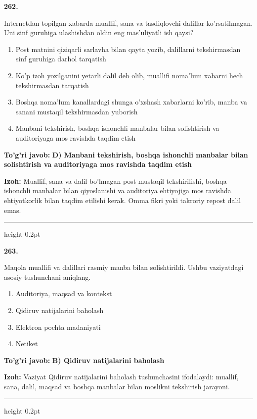 \documentclass[10pt,a4paper,oneside]{article}
\begin{document}
\noindent\textbf{\color{ink}262.}
\par
Internetdan topilgan xabarda muallif, sana va tasdiqlovchi dalillar ko'rsatilmagan. Uni sinf guruhiga ulashishdan oldin eng mas'uliyatli ish qaysi?
\begin{enumerate}[label=\Alph*),leftmargin=9mm]
\item Post matnini qiziqarli sarlavha bilan qayta yozib, dalillarni tekshirmasdan sinf guruhiga darhol tarqatish
\item Ko'p izoh yozilganini yetarli dalil deb olib, muallifi noma'lum xabarni hech tekshirmasdan tarqatish
\item Boshqa noma'lum kanallardagi shunga o'xshash xabarlarni ko'rib, manba va sanani mustaqil tekshirmasdan yuborish
\item Manbani tekshirish, boshqa ishonchli manbalar bilan solishtirish va auditoriyaga mos ravishda taqdim etish
\end{enumerate}
\begin{tcolorbox}[enhanced,breakable,colback=teal!4,colframe=teal!50!black,boxrule=0.5pt,arc=1.1mm,left=3mm,right=3mm,top=1.7mm,bottom=1.7mm,before skip=2mm,after skip=2mm]
\textbf{\color{teal}To'g'ri javob:} \textbf{D) Manbani tekshirish, boshqa ishonchli manbalar bilan solishtirish va auditoriyaga mos ravishda taqdim etish}
\par\smallskip
\textbf{Izoh:} Muallif, sana va dalil bo'lmagan post mustaqil tekshirilishi, boshqa ishonchli manbalar bilan qiyoslanishi va auditoriya ehtiyojiga mos ravishda ehtiyotkorlik bilan taqdim etilishi kerak. Omma fikri yoki takroriy repost dalil emas.
\end{tcolorbox}
\vspace{2mm}\hrule height 0.2pt \vspace{3mm}

\noindent\textbf{\color{ink}263.}
\par
Maqola muallifi va dalillari rasmiy manba bilan solishtirildi. Ushbu vaziyatdagi asosiy tushunchani aniqlang.
\begin{enumerate}[label=\Alph*),leftmargin=9mm]
\item Auditoriya, maqsad va kontekst
\item Qidiruv natijalarini baholash
\item Elektron pochta madaniyati
\item Netiket
\end{enumerate}
\begin{tcolorbox}[enhanced,breakable,colback=teal!4,colframe=teal!50!black,boxrule=0.5pt,arc=1.1mm,left=3mm,right=3mm,top=1.7mm,bottom=1.7mm,before skip=2mm,after skip=2mm]
\textbf{\color{teal}To'g'ri javob:} \textbf{B) Qidiruv natijalarini baholash}
\par\smallskip
\textbf{Izoh:} Vaziyat Qidiruv natijalarini baholash tushunchasini ifodalaydi: muallif, sana, dalil, maqsad va boshqa manbalar bilan moslikni tekshirish jarayoni.
\end{tcolorbox}
\vspace{2mm}\hrule height 0.2pt \vspace{3mm}
\end{document}
